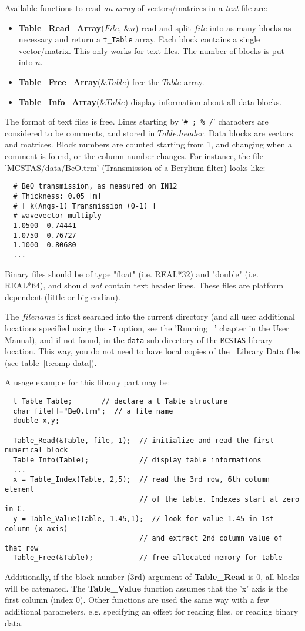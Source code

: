 Available functions to read \emph{an array} of vectors/matrices in a \emph{text} file are:
\begin{itemize}
\item {\bf Table\_Read\_Array}($File$, \&$n$) read and split $file$
into as many blocks as necessary and return a \verb+t_Table+ array.
Each block contains a single vector/matrix. This only works for text files.
The number of blocks is put into $n$.
\item {\bf Table\_Free\_Array}(\&$Table$) free the $Table$ array.
\item {\bf Table\_Info\_Array}(\&$Table$) display information about all data blocks.
\end{itemize}

The format of text files is free. Lines starting by '\verb+# ; % /+' characters are considered to be comments, and stored in $Table.header$. Data blocks are vectors and matrices. Block numbers are counted starting from 1, and changing when a comment is found, or the column number changes. For instance, the file 'MCSTAS/data/BeO.trm' (Transmission of a Berylium filter) looks like:
\begin{verbatim}
  # BeO transmission, as measured on IN12
  # Thickness: 0.05 [m]
  # [ k(Angs-1) Transmission (0-1) ]
  # wavevector multiply
  1.0500  0.74441
  1.0750  0.76727
  1.1000  0.80680
  ...
\end{verbatim}
Binary files should be of type "float" (i.e. REAL*32) and "double" (i.e. REAL*64),
and should \emph{not} contain text header lines. These files are platform
dependent (little or big endian).

The $filename$ is first searched into the current directory (and all user additional locations specified using the \verb+-I+ option, see the 'Running \MCS\ ' chapter in the User Manual), and if not found, in the \verb+data+ sub-directory of the \verb+MCSTAS+ library location. 
 This way, you do not need to have local copies of the \MCS\ Library Data files (see table~\ref{t:comp-data}).

A usage example for this library part may be:
\begin{verbatim}
  t_Table Table;       // declare a t_Table structure
  char file[]="BeO.trm";  // a file name
  double x,y;

  Table_Read(&Table, file, 1);  // initialize and read the first numerical block
  Table_Info(Table);            // display table informations
  ...
  x = Table_Index(Table, 2,5);  // read the 3rd row, 6th column element
                                // of the table. Indexes start at zero in C.
  y = Table_Value(Table, 1.45,1);  // look for value 1.45 in 1st column (x axis)
                                // and extract 2nd column value of that row
  Table_Free(&Table);           // free allocated memory for table
\end{verbatim}
Additionally, if the block number (3rd) argument of  {\bf Table\_Read} is 0, all blocks will be catenated.
The {\bf Table\_Value} function assumes that the 'x' axis is the first column (index 0).
Other functions are used the same way with a few additional parameters, e.g. specifying an offset for reading files, or reading binary data.


